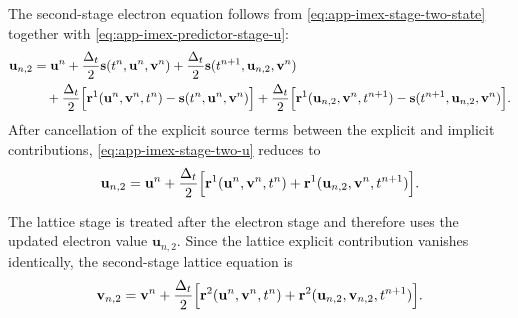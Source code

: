 The second-stage electron equation follows from \eqref{eq:app-imex-stage-two-state} together with \eqref{eq:app-imex-predictor-stage-u}:
\begin{equation}
    \begin{aligned}
        \mathbf{u}_{n,2}
         & =
        \mathbf{u}^{n}
        +
        \frac{\Delta_t}{2}
        \mathbf{s}(t^n,\mathbf{u}^{n},\mathbf{v}^{n})
        +
        \frac{\Delta_t}{2}
        \mathbf{s}(t^{n+1},\mathbf{u}_{n,2},\mathbf{v}^{n}) \\
         & \quad
        +
        \frac{\Delta_t}{2}
        \Bigl[
            \mathbf{r}^{1}(\mathbf{u}^{n},\mathbf{v}^{n},t^{n})
            -
            \mathbf{s}(t^n,\mathbf{u}^{n},\mathbf{v}^{n})
            \Bigr]
        +
        \frac{\Delta_t}{2}
        \Bigl[
            \mathbf{r}^{1}(\mathbf{u}_{n,2},\mathbf{v}^{n},t^{n+1})
            -
            \mathbf{s}(t^{n+1},\mathbf{u}_{n,2},\mathbf{v}^{n})
            \Bigr].
    \end{aligned}
    \label{eq:app-imex-stage-two-u}
\end{equation}
After cancellation of the explicit source terms between the explicit and implicit contributions, \eqref{eq:app-imex-stage-two-u} reduces to
\begin{equation}
    \mathbf{u}_{n,2}
    =
    \mathbf{u}^{n}
    +
    \frac{\Delta_t}{2}
    \Bigl[
        \mathbf{r}^{1}(\mathbf{u}^{n},\mathbf{v}^{n},t^{n})
        +
        \mathbf{r}^{1}(\mathbf{u}_{n,2},\mathbf{v}^{n},t^{n+1})
        \Bigr].
    \label{eq:app-imex-stage-two-u-reduced}
\end{equation}

The lattice stage is treated after the electron stage and therefore uses the updated electron value \(\mathbf{u}_{n,2}\). Since the lattice explicit contribution vanishes identically, the second-stage lattice equation is
\begin{equation}
    \mathbf{v}_{n,2}
    =
    \mathbf{v}^{n}
    +
    \frac{\Delta_t}{2}
    \Bigl[
        \mathbf{r}^{2}(\mathbf{u}^{n},\mathbf{v}^{n},t^{n})
        +
        \mathbf{r}^{2}(\mathbf{u}_{n,2},\mathbf{v}_{n,2},t^{n+1})
        \Bigr].
    \label{eq:app-imex-stage-two-v}
\end{equation}

